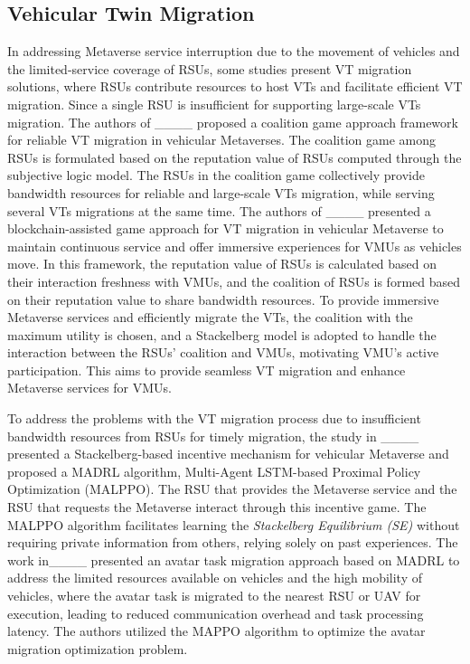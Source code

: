  \subsection{Vehicular Twin Migration}
In addressing Metaverse service interruption due to the movement of vehicles and the limited-service coverage of RSUs, some studies present VT migration solutions, where RSUs contribute resources to host VTs and facilitate efficient VT migration. Since a single RSU is insufficient for supporting large-scale VTs migration. The authors of ____ proposed a coalition game approach framework for reliable VT migration in vehicular Metaverses. The coalition game among RSUs is formulated based on the reputation value of RSUs computed through the subjective logic model. 
The RSUs in the coalition game collectively provide bandwidth resources for reliable and large-scale VTs migration, while serving several VTs migrations at the same time.
 The authors of ____ presented a blockchain-assisted game approach for VT migration in vehicular Metaverse to maintain continuous service and offer immersive experiences for VMUs as vehicles move. In this framework, the reputation value of RSUs is calculated based on their interaction freshness with VMUs, and the coalition of RSUs is formed based on their reputation value to share bandwidth resources. To provide immersive Metaverse services and efficiently migrate the VTs,  the coalition with the maximum utility is chosen, and a Stackelberg model is adopted to handle the interaction between the RSUs' coalition and VMUs, motivating VMU's active participation. This aims to provide seamless VT migration and enhance Metaverse services for VMUs. 
 
 To address the problems with the VT migration process due to insufficient bandwidth resources from RSUs for timely migration, the study in ____ presented a Stackelberg-based incentive mechanism for vehicular Metaverse and proposed a MADRL algorithm, Multi-Agent LSTM-based Proximal Policy Optimization (MALPPO). The RSU that provides the Metaverse service and the RSU that requests the Metaverse interact through this incentive game.  The MALPPO algorithm facilitates learning the \textit{Stackelberg Equilibrium (SE)} without requiring private information from others, relying solely on past experiences. The work in____ presented an avatar task migration approach based on MADRL to address the limited resources available on vehicles and the high mobility of vehicles, where the avatar task is migrated to the nearest RSU or UAV for execution, leading to reduced communication overhead and task processing latency.  The authors utilized the MAPPO algorithm to optimize the avatar migration optimization problem. 
 
